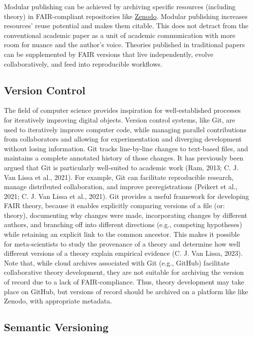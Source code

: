 \documentclass[
  man, noextraspace,floatsintext]{apa7}
\begin{document}
Modular publishing can be achieved by archiving specific resources (including theory) in FAIR-compliant repositories like \href{https://zenodo.org/}{Zenodo}.
Modular publishing increases resources' reuse potential and makes them citable.
This does not detract from the conventional academic paper as a unit of academic communication with more room for nuance and the author's voice.
Theories published in traditional papers can be supplemented by FAIR versions that live independently, evolve collaboratively, and feed into reproducible workflows.

\subsection{Version Control}\label{version-control}

The field of computer science provides inspiration for well-established processes for iteratively improving digital objects.
Version control systems, like Git, are used to iteratively improve computer code, while managing parallel contributions from collaborators and allowing for experimentation and diverging development without losing information.
Git tracks line-by-line changes to text-based files,
and maintains a complete annotated history of those changes.
It has previously been argued that Git is particularly well-suited to academic work (Ram, 2013; C. J. Van Lissa et al., 2021).
For example, Git can facilitate reproducible research, manage distributed collaboration, and improve preregistrations (Peikert et al., 2021; C. J. Van Lissa et al., 2021).
Git provides a useful framework for developing FAIR theory,
because it enables explicitly comparing versions of a file (or: theory),
documenting why changes were made,
incorporating changes by different authors,
and branching off into different directions (e.g., competing hypotheses) while retaining an explicit link to the common ancestor.
This makes it possible for meta-scientists to study the provenance of a theory and determine how well different versions of a theory explain empirical evidence (C. J. Van Lissa, 2023).
Note that, while cloud archives associated with Git (e.g., GitHub) facilitate collaborative theory development,
they are not suitable for archiving the version of record due to a lack of FAIR-compliance.
Thus, theory development may take place on GitHub, but versions of record should be archived on a platform like like Zenodo, with appropriate metadata.

\subsection{Semantic Versioning}\label{semantic-versioning}
\end{document}
